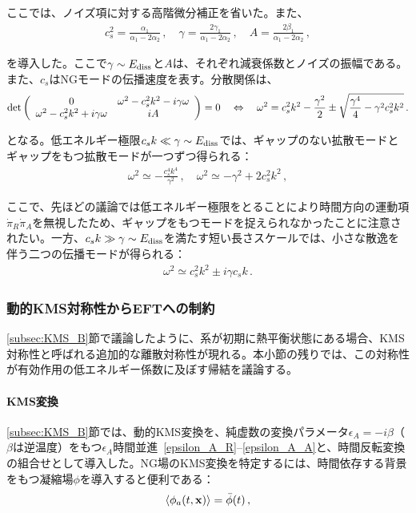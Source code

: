 ここでは、ノイズ項に対する高階微分補正を省いた。また、
\begin{align}
c_s^2=\frac{\alpha_1}{\alpha_1-2\alpha_2}\,,
\quad
\gamma=\frac{2\gamma_1}{\alpha_1-2\alpha_2}\,,
\quad
A=\frac{2\beta_1}{\alpha_1-2\alpha_2}\,,
\end{align}

を導入した。ここで$\gamma\sim E_{\rm diss}$と$A$は、それぞれ減衰係数とノイズの振幅である。また、$c_s$はNGモードの伝播速度を表す。分散関係は、
\begin{align}
{\rm det}\left(
\begin{array}{cc}0 &\omega^2-c_s^2k^2- i\gamma\omega \\ \omega^2-c_s^2k^2+ i\gamma\omega & iA\end{array}
\right)=0
\quad
\Leftrightarrow
\quad
\omega^2=c_{s}^{2}k^2-\frac{\gamma^2}{2}\pm\sqrt{\frac{\gamma^4}{4}-\gamma^2c_{s}^{2}k^2}\,.
\end{align}

となる。低エネルギー極限$c_{s}k\ll\gamma\sim E_{\rm diss}$では、ギャップのない拡散モードとギャップをもつ拡散モードが一つずつ得られる：
\begin{align}
\omega^2\simeq- \frac{c_{s}^{4}k^4}{\gamma^2}\,,
\quad
\omega^2\simeq-  \gamma^2+2c_{s}^{2}k^2\,,
\end{align}

ここで、先ほどの議論では低エネルギー極限をとることにより時間方向の運動項$\dot{\pi}_R\dot{\pi}_A$を無視したため、ギャップをもつモードを捉えられなかったことに注意されたい。一方、$c_{s}k\gg \gamma\sim E_{\rm diss}$を満たす短い長さスケールでは、小さな散逸を伴う二つの伝播モードが得られる：
\begin{align}
\omega^2\simeq c_{s}^{2}k^2\pm i \gamma c_{s}k\,.
\end{align}

\subsubsection{動的KMS対称性からEFTへの制約}
\label{subsec:KMS}

\ref{subsec:KMS_B}節で議論したように、系が初期に熱平衡状態にある場合、KMS対称性と呼ばれる追加的な離散対称性が現れる。本小節の残りでは、この対称性が有効作用の低エネルギー係数に及ぼす帰結を議論する。

\paragraph{KMS変換}

\medskip
\ref{subsec:KMS_B}節では、動的KMS変換を、純虚数の変換パラメータ$\epsilon_A=-i\beta$（$\beta$は逆温度）をもつ$\epsilon_A$時間並進~\eqref{epsilon_A_R}--\eqref{epsilon_A_A}と、時間反転変換の組合せとして導入した。NG場のKMS変換を特定するには、時間依存する背景をもつ凝縮場$\phi$を導入すると便利である：
\begin{align}
\langle\phi_a(t,{\bf x})\rangle=\bar{\phi}(t)\,,
\end{align}

